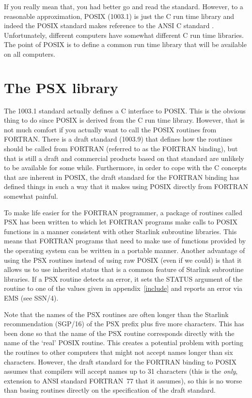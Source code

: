 \documentclass[twoside,11pt]{article}
\newcommand{\xref}[3]{#1}
\newcommand{\xlabel}[1]{}
\renewcommand{\_}{\texttt{\symbol{95}}}
\begin{document}
If you really mean that, you had better go and read the standard\cite{psx:std}.
However, to a reasonable approximation, POSIX (1003.1) is just the C run time
library and indeed the POSIX standard makes reference to the ANSI C standard
\cite{c:std}. Unfortunately, different computers have somewhat different C
run time libraries. The point of POSIX is to define a common run time library
that will be available on all computers.

\section{\xlabel{the_psx_library}The PSX library}

The 1003.1 standard actually defines a C interface to POSIX. This is
the obvious thing to do since POSIX is derived from the C run time
library. However, that is not much comfort if you actually want to call
the POSIX routines from FORTRAN. There is a draft standard (1003.9)
that defines how the routines should be called from FORTRAN (referred
to as the FORTRAN binding), but that is still a draft and commercial
products based on that standard are unlikely to be available for some
while. Furthermore, in order to cope with the C concepts that are
inherent in POSIX, the draft standard for the FORTRAN binding has
defined things in such a way that it makes using POSIX directly from
FORTRAN somewhat painful.

To make life easier for the FORTRAN programmer, a package of routines
called PSX has been written to which let FORTRAN programs make calls to
POSIX functions in a manner consistent with other Starlink subroutine
libraries. This means that FORTRAN programs that need to make use of
functions provided by the operating system can be written in a portable
manner. Another advantage of using the PSX routines instead of using
raw POSIX (even if we could) is that it allows us to use inherited
status that is a common feature of Starlink subroutine libraries. If a
PSX routine detects an error, it sets the STATUS argument of the
routine to one of the values given in appendix~\ref{include} and
reports an error via EMS (see \xref{SSN/4}{ssn4}{}).

Note that the names of the PSX routines are often longer than the
Starlink recommendation (\xref{SGP/16}{sgp16}{}) of the PSX\_ prefix
plus five more characters. This has been done so that the name of the
PSX routine corresponds directly with the name of the `real' POSIX
routine. This creates a potential problem with porting the routines to
other computers that might not accept names longer than six characters.
However, the draft standard for the FORTRAN binding to POSIX assumes
that compilers will accept names up to 31 characters (this is the
\emph{only}, extension to ANSI standard FORTRAN~77 that it assumes), so
this is no worse than basing routines directly on the specification of
the draft standard.
\end{document}
